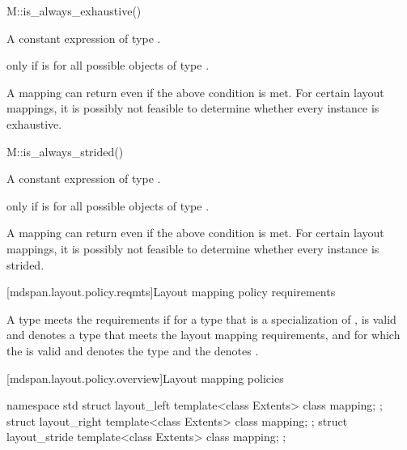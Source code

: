 \begin{itemdecl}
M::is_always_exhaustive()
\end{itemdecl}

\begin{itemdescr}
\pnum
\result
A constant expression of type .

\pnum
\returns
{} only if  is 
for all possible objects  of type .
\begin{note}
A mapping can return  even if the above condition is met.
For certain layout mappings, it is possibly not feasible to determine
whether every instance is exhaustive.
\end{note}
\end{itemdescr}

\begin{itemdecl}
M::is_always_strided()
\end{itemdecl}

\begin{itemdescr}
\pnum
\result
A constant expression of type .

\pnum
\returns
{} only if  is 
for all possible objects  of type .
\begin{note}
A mapping can return  even if the above condition is met.
For certain layout mappings, it is possibly not feasible to determine
whether every instance is strided.
\end{note}
\end{itemdescr}

[mdspan.layout.policy.reqmts]{Layout mapping policy requirements}

\pnum
A type  meets the  requirements
if for a type  that is a specialization of ,
 is valid and denotes a type 
that meets the layout mapping requirements, and
for which the   is valid and
denotes the type  and
the   denotes .

[mdspan.layout.policy.overview]{Layout mapping policies}

\begin{codeblock}
namespace std {
  struct layout_left {
    template<class Extents>
      class mapping;
  };
  struct layout_right {
    template<class Extents>
      class mapping;
  };
  struct layout_stride {
    template<class Extents>
      class mapping;
  };
}
\end{codeblock}

